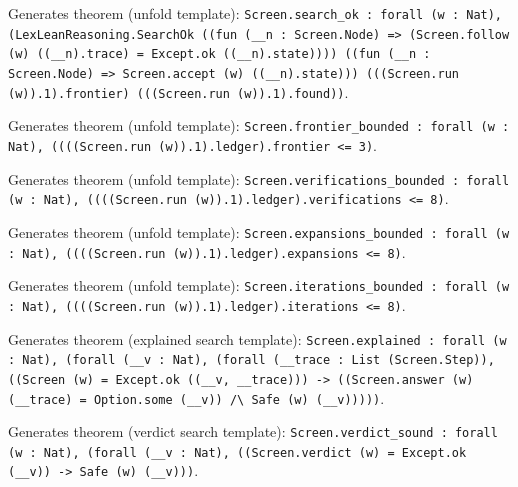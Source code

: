 \documentclass[11pt]{article}
\begin{document}
\noindent Generates theorem (unfold template): \texttt{Screen.search\_ok : forall (w : Nat), (LexLeanReasoning.SearchOk ((fun (\_\_n : Screen.Node) => (Screen.follow (w) ((\_\_n).trace) = Except.ok ((\_\_n).state)))) ((fun (\_\_n : Screen.Node) => Screen.accept (w) ((\_\_n).state))) (((Screen.run (w)).1).frontier) (((Screen.run (w)).1).found))}.\par
\noindent Generates theorem (unfold template): \texttt{Screen.frontier\_bounded : forall (w : Nat), ((((Screen.run (w)).1).ledger).frontier <= 3)}.\par
\noindent Generates theorem (unfold template): \texttt{Screen.verifications\_bounded : forall (w : Nat), ((((Screen.run (w)).1).ledger).verifications <= 8)}.\par
\noindent Generates theorem (unfold template): \texttt{Screen.expansions\_bounded : forall (w : Nat), ((((Screen.run (w)).1).ledger).expansions <= 8)}.\par
\noindent Generates theorem (unfold template): \texttt{Screen.iterations\_bounded : forall (w : Nat), ((((Screen.run (w)).1).ledger).iterations <= 8)}.\par
\noindent Generates theorem (explained search template): \texttt{Screen.explained : forall (w : Nat), (forall (\_\_v : Nat), (forall (\_\_trace : List (Screen.Step)), ((Screen (w) = Except.ok ((\_\_v, \_\_trace))) -> ((Screen.answer (w) (\_\_trace) = Option.some (\_\_v)) /\textbackslash{} Safe (w) (\_\_v)))))}.\par
\noindent Generates theorem (verdict search template): \texttt{Screen.verdict\_sound : forall (w : Nat), (forall (\_\_v : Nat), ((Screen.verdict (w) = Except.ok (\_\_v)) -> Safe (w) (\_\_v)))}.\par
\end{document}
